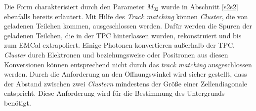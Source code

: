 Die Form charakterisiert durch den Parameter $M_{02}$ wurde in Abschnitt \ref{s2s2} ebenfalls bereits erläutert.
Mit Hilfe des \textit{Track matching} können \textit{Cluster}, die von geladenen Teilchen kommen, ausgeschlossen werden.
Dafür werden die Spuren der geladenen Teilchen, die in der TPC hinterlassen wurden, rekonstruiert und bis zum EMCal extrapoliert.
Einige Photonen konvertieren außerhalb der TPC.
\textit{Cluster} durch Elektronen und beziehungsweise oder Positronen aus diesen Konversionen können entsprechend nicht durch das \textit{track matching} ausgeschlossen werden. 
\newline
Durch die Anforderung an den Öffnungswinkel wird sicher gestellt, dass der Abstand zwischen zwei \textit{Clustern} mindestens der Größe einer Zellendiagonale entspricht.
Diese Anforderung wird für die Bestimmung des Untergrunds benötigt.